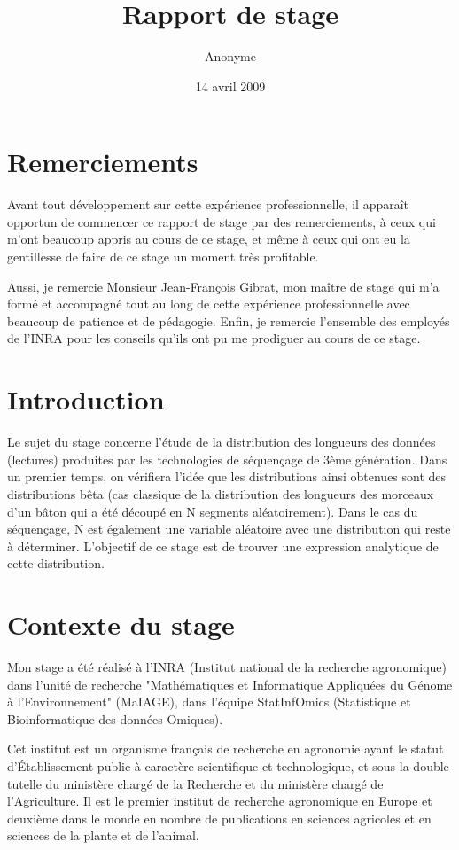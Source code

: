 \documentclass[12pt,a4paper]{article} %
\title{Rapport de stage}
\author{Anonyme}
\date{14 avril 2009}
\begin{document}
\maketitle
\newpage
\section*{Remerciements}

Avant tout développement sur cette expérience professionnelle, il apparaît opportun de commencer ce rapport de stage par des remerciements, à ceux qui m’ont beaucoup appris au cours de ce stage, et même à ceux qui ont eu la gentillesse de faire de ce stage un moment très profitable.

Aussi, je remercie Monsieur Jean-François Gibrat, mon maître de stage qui m’a formé et accompagné tout au long de cette expérience professionnelle avec beaucoup de patience et de pédagogie. Enfin, je remercie l’ensemble des employés de l'INRA pour les conseils qu’ils ont pu me prodiguer au cours de ce stage.
\newpage
\tableofcontents
\newpage
\section{Introduction} 
Le  sujet du stage concerne l'étude de la distribution des longueurs des données (lectures) produites par les technologies de séquençage de 3ème génération.
Dans un premier temps, on vérifiera l'idée que les distributions ainsi obtenues sont des distributions bêta (cas classique de la distribution
des longueurs des morceaux d'un bâton qui a été découpé en N segments
aléatoirement). Dans le cas du séquençage, N est également une
variable aléatoire avec une distribution qui reste à déterminer.
L'objectif de ce stage est de trouver une expression analytique de cette distribution.
\newpage
\section{Contexte du stage} 


Mon stage a été réalisé à l'INRA (Institut national de la recherche agronomique) dans l'unité de recherche "Mathématiques et Informatique Appliquées du Génome à l'Environnement" (MaIAGE), dans l'équipe StatInfOmics (Statistique et Bioinformatique des données Omiques).

Cet institut est un organisme français de recherche en agronomie ayant le statut d’Établissement public à caractère scientifique et technologique, et sous la double tutelle du ministère chargé de la Recherche et du ministère chargé de l’Agriculture. Il est le premier institut de recherche agronomique en Europe et deuxième dans le monde en nombre de publications en sciences agricoles et en sciences de la plante et de l'animal.
\end{document}
